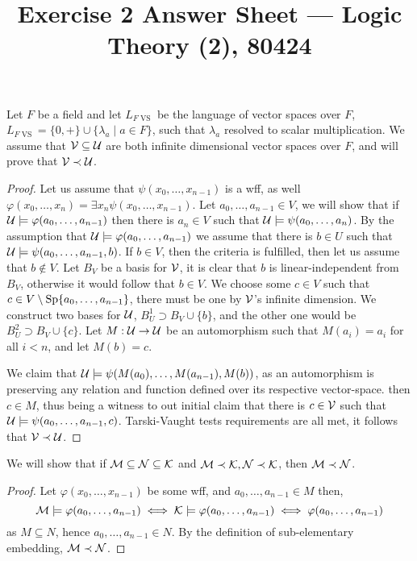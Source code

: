 
\title{Exercise 2 Answer Sheet --- Logic Theory (2), 80424}


\maketitle
\maketitleprint{}

\question{}
Let $F$ be a field and let $L_{F \operatorname{VS}}$ be the language of vector spaces over $F$,
$L_{F \operatorname{VS}} = \{0, +\} \cup \{ \lambda_a \mid a \in F \}$, such that $\lambda_a$ resolved to scalar multiplication.
We assume that $\mathcal{V} \subseteq \mathcal{U}$ are both infinite dimensional vector spaces over $F$, and will prove that $\mathcal{V} \prec \mathcal{U}$.
\begin{proof}
	Let us assume that $\psi(x_0, \dots, x_{n - 1})$ is a wff, as well $\varphi(x_0, \dots, x_n) = \exists x_n \psi(x_0, \dots, x_{n - 1})$.
	Let $a_0, \dots, a_{n - 1} \in V$, we will show that if $\mathcal{U} \models \varphi(a_0, \dots, a_{n - 1})$ then there is $a_n \in V$ such that $\mathcal{U} \models \psi(a_0, \dots, a_n)$.
	By the assumption that $\mathcal{U} \models \varphi(a_0, \dots, a_{n - 1})$ we assume that there is $b \in U$ such that $\mathcal{U} \models \psi(a_0, \dots, a_{n - 1}, b)$.
	If $b \in V$, then the criteria is fulfilled, then let us assume that $b \notin V$.
	Let $B_V$ be a basis for $\mathcal{V}$, it is clear that $b$ is linear-independent from $B_V$, otherwise it would follow that $b \in V$.
	We choose some $c \in V$ such that $c \in V \setminus \operatorname{Sp}\{ a_0, \dots, a_{n - 1} \}$, there must be one by $\mathcal{V}$'s infinite dimension.
	We construct two bases for $\mathcal{U}$, $B_U^1 \supset B_V \cup \{ b \}$, and the other one would be $B_U^2 \supset B_V \cup \{ c \}$.
	Let $M : \mathcal{U} \to \mathcal{U}$ be an automorphism such that $M(a_i) = a_i$ for all $i < n$, and let $M(b) = c$.

	We claim that $\mathcal{U} \models \psi(M(a_0), \dots, M(a_{n - 1}), M(b))$, as an automorphism is preserving any relation and function defined over its respective vector-space.
	then $c \in M$, thus being a witness to out initial claim that there is $c \in \mathcal{V}$ such that $\mathcal{U} \models \psi(a_0, \dots, a_{n - 1}, c)$.
	Tarski-Vaught tests requirements are all met, it follows that $\mathcal{V} \prec \mathcal{U}$.
\end{proof}

\question{}
\subquestion{}
We will show that if $\mathcal{M} \subseteq \mathcal{N} \subseteq \mathcal{K}$ and $\mathcal{M} \prec \mathcal{K}, \mathcal{N} \prec \mathcal{K}$, then $\mathcal{M} \prec \mathcal{N}$.
\begin{proof}
	Let $\varphi(x_0, \dots, x_{n - 1})$ be some wff, and $a_0, \dots, a_{n - 1} \in M$ then,
	\[
		\mathcal{M} \models \varphi(a_0, \dots, a_{n - 1}) \iff \mathcal{K} \models \varphi(a_0, \dots, a_{n - 1}) \iff \varphi(a_0, \dots, a_{n - 1})
	\]
	as $M \subseteq N$, hence $a_0, \dots, a_{n - 1} \in N$.
	By the definition of sub-elementary embedding, $\mathcal{M} \prec \mathcal{N}$.
\end{proof}

